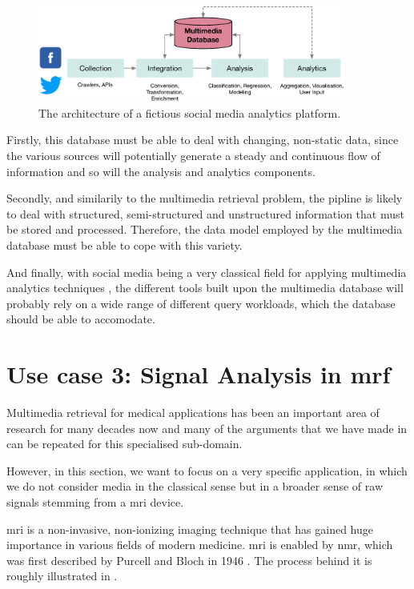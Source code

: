 \begin{figure}[tb]
    \centering
    \includegraphics[width=0.90\textwidth]{figures/social-media-architecture.eps}
    \caption{The architecture of a fictious social media analytics platform.}
    \label{figure:social-media}
\end{figure}

Firstly, this database must be able to deal with changing, non-static data, since the various sources will potentially generate a steady and continuous flow of information and so will the analysis and analytics components.

Secondly, and similarily to the multimedia retrieval problem, the pipline is likely to deal with structured, semi-structured and unstructured information that must be stored and processed. Therefore, the data model employed by the multimedia database must be able to cope with this variety. 

And finally, with social media being a very classical field for applying multimedia analytics techniques \cite{Pouyanfar:2018,Jonson:2016}, the different tools built upon the multimedia database will probably rely on a wide range of different query workloads, which the database should be able to accomodate.

\section{Use case 3: Signal Analysis in \acrshort{mrf}}
\label{section:application_mrf}

Multimedia retrieval for medical applications has been an important area of research for many decades now \cite{Mueller:2017Retrieval,Mueller:2004Review} and many of the arguments that we have made in  can be repeated for this specialised sub-domain.

However, in this section, we want to focus on a very specific application, in which we do not consider media in the classical sense but in a broader sense of raw signals stemming from a \acrfull{mri} device.

\acrshort{mri} is a non-invasive, non-ionizing imaging technique that has gained huge importance in various fields of modern medicine. \acrshort{mri} is enabled by \acrfull{nmr}, which was first described by Purcell and Bloch in 1946 \cite{Bloch:1946Nuclear,Purcell:1946Resonance}. The process behind it is roughly illustrated in .

